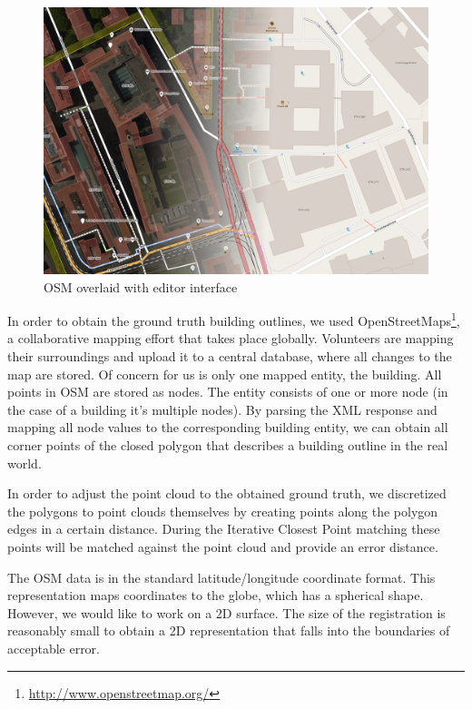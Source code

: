 \documentclass[10pt,twocolumn,letterpaper]{article}
\begin{document}
\begin{figure}[h]
   \centering
   \includegraphics[width=\linewidth]{images/osm_map.png}
   \caption{OSM overlaid with editor interface}
   \label{fig:figure1}
\end{figure}


In order to obtain the ground truth building outlines, we used OpenStreetMaps\footnote{\url{http://www.openstreetmap.org/}}, a collaborative mapping effort that takes place globally. Volunteers are mapping their surroundings and upload it to a central database, where all changes to the map are stored. 
Of concern for us is only one mapped entity, the building. All points in OSM are stored as nodes. The entity consists of one or more node (in the case of a building it's multiple nodes). By parsing the XML response and mapping all node values to the corresponding building entity, we can obtain all corner points of the closed polygon that describes a building outline in the real world.

In order to adjust the point cloud to the obtained ground truth, we discretized the polygons to point clouds themselves by creating points along the polygon edges in a certain distance. During the Iterative Closest Point matching these points will be matched against the point cloud and provide an error distance.

The OSM data is in the standard latitude/longitude coordinate format. This representation maps coordinates to the globe, which has a spherical shape. However, we would like to work on a 2D surface. The size of the registration is reasonably small to obtain a 2D representation that falls into the boundaries of acceptable error.
\end{document}
